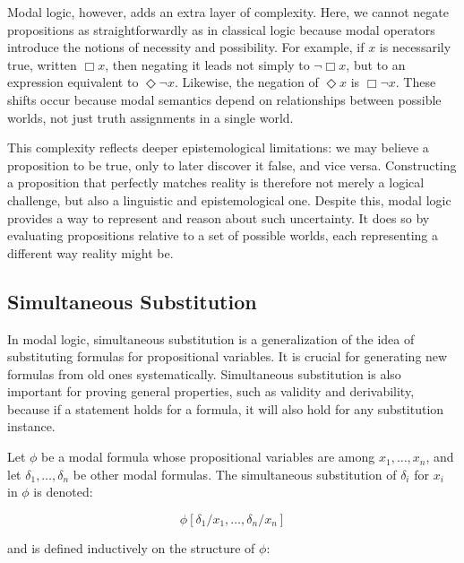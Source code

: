 \documentclass[12pt,a4paper,openany]{article}
\begin{document}
Modal logic, however, adds an extra layer of complexity. Here, we cannot negate propositions as straightforwardly as in classical logic because modal operators introduce the notions of necessity and possibility. For example, if $x$ is necessarily true, written $\Box x$, then negating it leads not simply to $\neg \Box x$, but to an expression equivalent to $\Diamond \neg x$. Likewise, the negation of $\Diamond x$ is $\Box \neg x$. These shifts occur because modal semantics depend on relationships between possible worlds, not just truth assignments in a single world.

This complexity reflects deeper epistemological limitations: we may believe a proposition to be true, only to later discover it false, and vice versa. Constructing a proposition that perfectly matches reality is therefore not merely a logical challenge, but also a linguistic and epistemological one. Despite this, modal logic provides a way to represent and reason about such uncertainty. It does so by evaluating propositions relative to a set of possible worlds, each representing a different way reality might be.

\subsection{Simultaneous Substitution}

In modal logic, simultaneous substitution is a generalization of the idea of substituting formulas for propositional variables. It is crucial for generating new formulas from old ones systematically. Simultaneous substitution is also important for proving general properties, such as validity and derivability, because if a statement holds for a formula, it will also hold for any substitution instance.

Let $\phi$ be a modal formula whose propositional variables are among $x_1, \dots, x_n$, and let $\delta_1, \dots, \delta_n$ be other modal formulas. The simultaneous substitution of $\delta_i$ for $x_i$ in $\phi$ is denoted:

$$
\phi[\delta_1/x_1, \dots, \delta_n/x_n]
$$

and is defined inductively on the structure of $\phi$:
\end{document}
